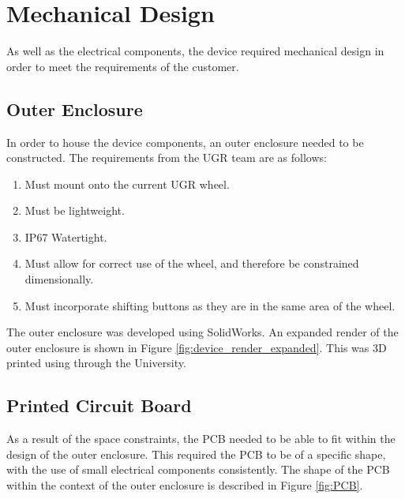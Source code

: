 \documentclass[a4paper,12pt]{article}
\begin{document}

\newpage
\section{Mechanical Design}
\label{sec:mechanical_design}

As well as the electrical components, the device required mechanical design in order to meet the requirements of the customer.

\subsection{Outer Enclosure}
\label{sec:outer_enclosure}

In order to house the device components, an outer enclosure needed to be constructed. The requirements from the UGR team are as follows:

\begin{enumerate}
  \item Must mount onto the current UGR wheel.
  \item Must be lightweight.
  \item IP67 Watertight.
  \item Must allow for correct use of the wheel, and therefore be constrained dimensionally.
  \item Must incorporate shifting buttons as they are in the same area of the wheel.
\end{enumerate}

The outer enclosure was developed using SolidWorks. An expanded render of the outer enclosure is shown in Figure \ref{fig:device_render_expanded}. This was 3D printed using through the University.



\subsection{Printed Circuit Board}
\label{sec:printed_circuit_board}

As a result of the space constraints, the PCB needed to be able to fit within the design of the outer enclosure. This required the PCB to be of a specific shape, with the use of small electrical components consistently. The shape of the PCB within the context of the outer enclosure is described in Figure \ref{fig:PCB}.
\end{document}
